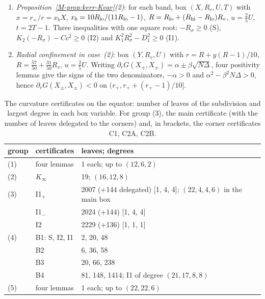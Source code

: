 \documentclass[aip,jmp,amsmath,amssymb,reprint]{revtex4-2}
\theoremstyle{plain}
\theoremstyle{definition}
\begin{document}
\begin{enumerate}
  certificate of each delegates two corners where both $y$ and either $1-T$ or $a$ are small: the corner
  C1 ($y\le1/8$, $T\ge15/16$) is the affine image of a separate box; the corner C2 ($y\le1/8$, $A\le1/8$) is
  covered by two sectors, C2A ($a\le2y$, with $a=2yA'$) and C2B ($2y\le a$, with $y=aY'/2$), in which the
  common power of the small parameter is divided out of $P_0$ and $P_1$.
\item \emph{Proposition~\ref{M-prop:kerr-Kvar}(2)}: for each band, box $(X,R_v,U,T)$ with $x=r_+/r=x_bX$,
  $x_b=10R_{\rm lo}/(11R_{\rm lo}-1)$, $R=R_{\rm lo}+(R_{\rm hi}-R_{\rm lo})R_v$, $u=\frac25U$, $t=2T-1$. Three
  inequalities with one square root: $-R_\sigma\ge0$ (S), $K_2(-R_\sigma)-Cc^2\ge0$ (I2) and $K_1^2R_\sigma^2-D_1^2\ge0$
  (I1).
\item \emph{Radial confinement in case~(2)}: box $(Y,R_v,U)$ with $r=R+y(R-1)/10$, $R=\frac{57}{50}+\frac{31}{50}R_v$,
  $u=\frac25U$. Writing $\partial_rG(X_\pm,X_\pm)=\alpha\pm\beta\sqrt{N\Delta}$, four positivity lemmas give the
  signs of the two denominators, $-\alpha>0$ and $\alpha^2-\beta^2N\Delta>0$, hence $\partial_rG(X_\pm,X_\pm)<0$ on
  $(r_+,r_++(r_+-1)/10]$.
\end{enumerate}

\begin{table}[ht]
\caption{\label{tab:kerr-cert}The curvature certificates on the equator: number of leaves of the
subdivision and largest degree in each box variable. For group (3), the main certificate (with the number
of leaves delegated to the corners) and, in brackets, the corner certificates C1, C2A, C2B.}
\begin{center}
\begin{tabular}{lll}
\hline
group & certificates & leaves; degrees\\
\hline
(1) & four lemmas & 1 each; up to $(12,6,2)$\\
(2) & $K_\infty$ & 19; $(16,12,8)$\\
(3) & I1$_+$ & 2007 (+144 delegated) [1, 4, 4]; $(22,4,4,6)$ in the main box\\
    & I1$_-$ & 2024 (+144) [1, 4, 4]\\
    & I2 & 2229 (+136) [1, 1, 1]\\
(4) & B1: S, I2, I1 & 2, 20, 48\\
    & B2 & 6, 36, 58\\
    & B3 & 20, 66, 238\\
    & B4 & 81, 148, 1414; I1 of degree $(21,17,8,8)$\\
(5) & four lemmas & 1 each; up to $(22,22,6)$\\
\hline
\end{tabular}
\end{center}
\end{table}
\end{document}
